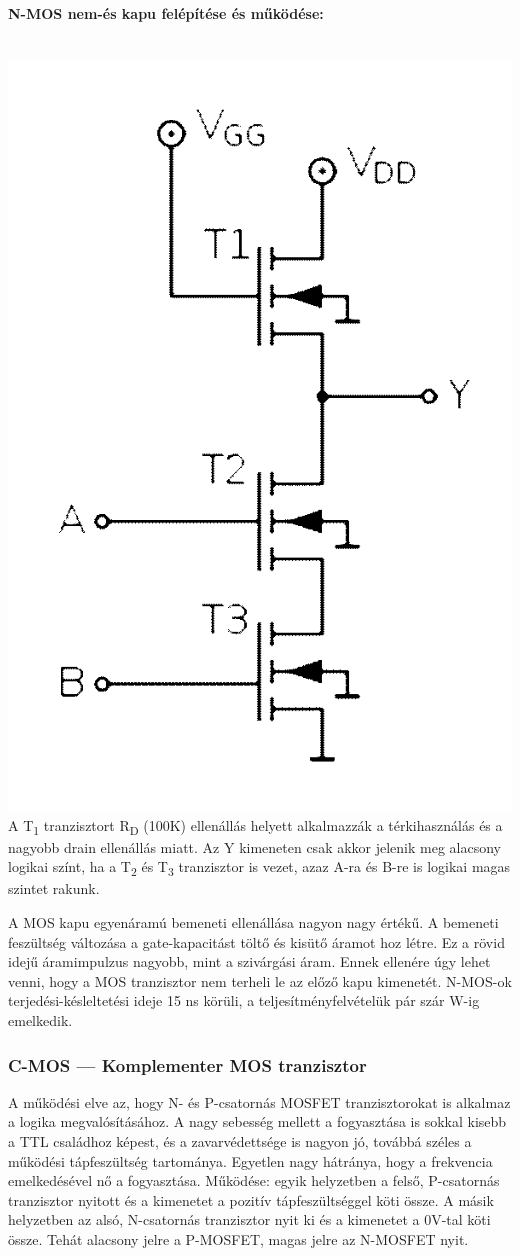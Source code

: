 \paragraph{N-MOS nem-és kapu felépítése és működése:}~\\
\includegraphics[width=0.5\linewidth]{fig/11-NMOS_NAND_schema1}\\
A T\textsubscript{1} tranzisztort R\textsubscript{D} (100K\textOmega) ellenállás helyett alkalmazzák a térkihasználás és a nagyobb drain ellenállás miatt. Az Y kimeneten csak akkor jelenik meg alacsony logikai színt, ha a T\textsubscript{2} és T\textsubscript{3} tranzisztor is vezet, azaz A-ra és B-re is logikai magas szintet rakunk.

A MOS kapu egyenáramú bemeneti ellenállása nagyon nagy értékű. A bemeneti feszültség változása a gate-kapacitást töltő és kisütő áramot hoz létre. Ez a rövid idejű áramimpulzus nagyobb, mint a szivárgási áram. Ennek ellenére úgy lehet venni, hogy a MOS tranzisztor nem terheli le az előző kapu kimenetét. N-MOS-ok terjedési-késleltetési ideje 15 ns körüli, a teljesítményfelvételük pár szár \textmu W-ig emelkedik.

\subsubsection{C-MOS --- Komplementer MOS tranzisztor}
A működési elve az, hogy N- és P-csatornás MOSFET tranzisztorokat is alkalmaz a logika megvalósításához. A nagy sebesség mellett a fogyasztása is sokkal kisebb a TTL családhoz képest, és a zavarvédettsége is nagyon jó, továbbá széles a működési tápfeszültség tartománya. Egyetlen nagy hátránya, hogy a frekvencia emelkedésével nő a fogyasztása. Működése: egyik helyzetben a felső, P-csatornás tranzisztor nyitott és a kimenetet a pozitív tápfeszültséggel köti össze. A másik helyzetben az alsó, N-csatornás tranzisztor nyit ki és a kimenetet a 0V-tal köti össze. Tehát alacsony jelre a P-MOSFET, magas jelre az N-MOSFET nyit.


